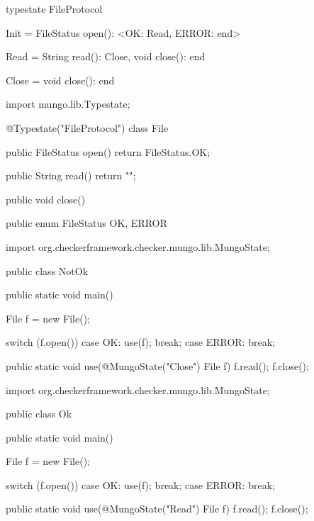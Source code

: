 \begin{code}
typestate FileProtocol {

  Init = {
    FileStatus open(): <OK: Read, ERROR: end>
  }

  Read = {
    String read(): Close,
    void close(): end
  }

  Close = {
    void close(): end
  }

}\end{code}

\begin{code}
import mungo.lib.Typestate;

@Typestate("FileProtocol")
class File {

  public FileStatus open() {
    return FileStatus.OK;
  }

  public String read() {
    return "";
  }

  public void close() {
  }

}\end{code}

\begin{code}
public enum FileStatus {
  OK, ERROR
}\end{code}

\begin{code}
import org.checkerframework.checker.mungo.lib.MungoState;

public class NotOk {

  public static void main() {
    File f = new File();

    switch (f.open()) {
      case OK:
        use(f);
        break;
      case ERROR:
        break;
    }
  }

  public static void use(@MungoState("Close") File f) {
    f.read();
    f.close();
  }

}\end{code}

\begin{code}
import org.checkerframework.checker.mungo.lib.MungoState;

public class Ok {

  public static void main() {
    File f = new File();

    switch (f.open()) {
      case OK:
        use(f);
        break;
      case ERROR:
        break;
    }
  }

  public static void use(@MungoState("Read") File f) {
    f.read();
    f.close();
  }

}\end{code}

